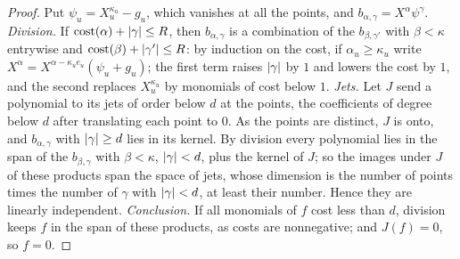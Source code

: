 \begin{proof}
Put $\psi_u=X_u^{\kappa_u}-g_u$, which vanishes at all the points, and $b_{\alpha,\gamma}=X^\alpha\psi^\gamma$. \emph{Division.} If $\mathrm{cost}(\alpha)+\lvert \gamma\rvert\le R$, then $b_{\alpha,\gamma}$ is a combination of the $b_{\beta,\gamma'}$ with $\beta<\kappa$ entrywise and $\mathrm{cost}(\beta)+\lvert \gamma'\rvert\le R$: by induction on the cost, if $\alpha_u\ge\kappa_u$ write $X^\alpha=X^{\alpha-\kappa_ue_u}(\psi_u+g_u)$; the first term raises $\lvert \gamma\rvert$ by $1$ and lowers the
cost by $1$, and the second replaces $X_u^{\kappa_u}$ by monomials of cost below $1$. \emph{Jets.} Let $J$ send a polynomial to its jets of order below $d$ at the points, the coefficients of degree below $d$ after translating each point to $0$. As the points are distinct, $J$ is onto, and $b_{\alpha,\gamma}$ with $\lvert \gamma\rvert\ge d$ lies in its kernel. By division every polynomial lies in the span of the $b_{\beta,\gamma}$ with $\beta<\kappa$,
$\lvert \gamma\rvert<d$, plus the kernel of $J$; so the images under $J$ of these products span the space of jets, whose dimension is the number of points times the number of $\gamma$ with $\lvert \gamma\rvert<d$, at least their number. Hence they are linearly independent. \emph{Conclusion.} If all monomials of $f$ cost less than $d$, division keeps $f$ in the span of these products, as costs are nonnegative; and $J(f)=0$, so $f=0$.
\end{proof}

